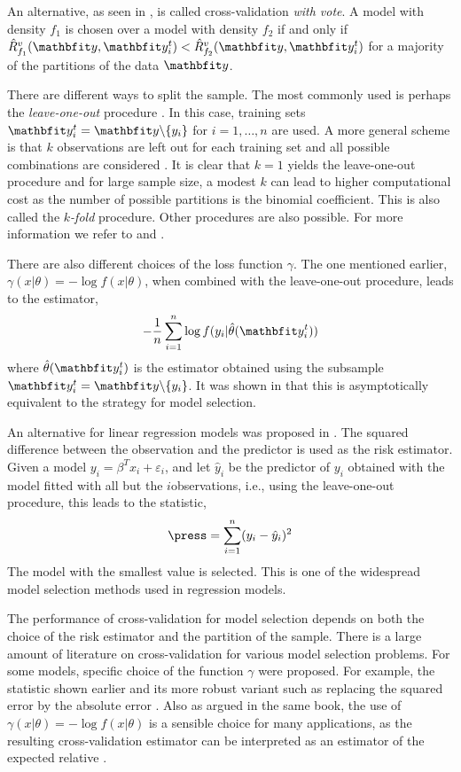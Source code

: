 An alternative, as seen in \cite{Yang:2007vx}, is called cross-validation
\emph{with vote}. A model with density $f_1$ is chosen over a model with
density $f_2$ if and only if $\hat{R}_{f_1}^v(\data,\data_i^t) <
\hat{R}_{f_2}^v(\data,\data_i^t)$ for a majority of the partitions of the data
$\data$.

There are different ways to split the sample. The most commonly used is
perhaps the \emph{leave-one-out} procedure \cite{Stone:1974vx,Geisser:1975vx}.
In this case, training sets $\data_i^t = \data\backslash\{y_i\}$ for $i =
1,\dots,n$ are used. A more general scheme is that $k$ observations are left
out for each training set and all possible combinations are considered
\cite{Shao:1993vx}.  It is clear that $k=1$ yields the leave-one-out procedure
and for large sample size, a modest $k$ can lead to higher computational cost
as the number of possible partitions is the binomial coefficient. This is also
called the $k$\emph{-fold} procedure. Other procedures are also possible. For
more information we refer to \cite{Stone:1978vx} and \cite{Hjorth:1994vx}.

There are also different choices of the loss function $\gamma$. The one
mentioned earlier, $\gamma(x|\theta) = -\log f(x|\theta)$, when combined with
the leave-one-out procedure, leads to the estimator,
\begin{equation}
  -\frac{1}{n}\sum_{i=1}^n\log f(y_i|\hat\theta(\data_i^t))
\end{equation}
where $\hat\theta(\data_i^t)$ is the estimator obtained using the subsample
$\data_i^t = \data\backslash\{y_i\}$. It was shown in \cite{Stone:1978vx} that
this is asymptotically equivalent to the \aic strategy for model selection.

An alternative for linear regression models was proposed in
\cite{Allen:1974vx}. The squared difference between the observation and the
predictor is used as the risk estimator. Given a model $y_i = \beta^T x_i +
\varepsilon_i$, and let $\hat{y}_i$ be the predictor of $y_i$ obtained with
the model fitted with all but the $i$\xth observations, i.e., using the
leave-one-out procedure, this leads to the \press statistic,
\begin{equation}
  \press = \sum_{i=1}^n(y_i - \hat{y}_i)^2
\end{equation}
The model with the smallest \press value is selected. This is one of the
widespread model selection methods used in regression models.

The performance of cross-validation for model selection depends on both the
choice of the risk estimator and the partition of the sample. There is a large
amount of literature on cross-validation for various model selection problems.
For some models, specific choice of the function $\gamma$ were proposed. For
example, the \press statistic shown earlier and its more robust variant such
as replacing the squared error by the absolute error
\cite[][sec.~2.9]{Claeskens:2008tq}.  Also as argued in the same book, the use
of $\gamma(x|\theta) = -\log f(x|\theta)$ is a sensible choice for many
applications, as the resulting cross-validation estimator can be interpreted
as an estimator of the expected relative \kld.

